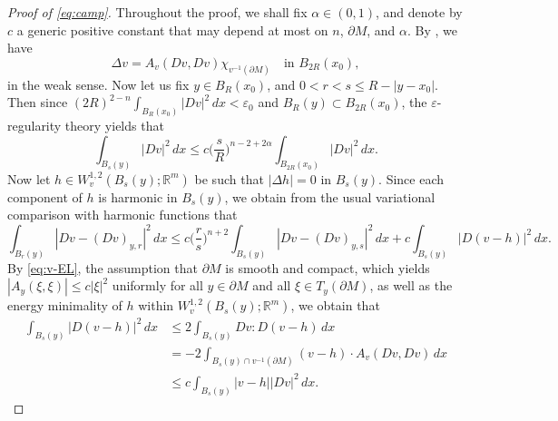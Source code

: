 \documentclass[11pt]{amsart}
\newcommand{\R}{{\mathbb R}}
\newcommand{\e}{\varepsilon}
\theoremstyle{plain}
\theoremstyle{definition}
\theoremstyle{remark}
\numberwithin{equation}{section}
\begin{document}
\begin{proof}[Proof of \eqref{eq:camp}]
    Throughout the proof, we shall fix $\alpha \in (0,1)$, and denote by $c$ a generic positive constant that may depend at most on $n$, $\partial M$, and $\alpha$.    
    By \cite{D}, we have 
    \begin{equation}
        \label{eq:v-EL}
        \Delta v = A_v(Dv,Dv)\chi_{v^{-1}(\partial M)}\quad\text{in }B_{2R}(x_0),
    \end{equation}
    in the weak sense. Now let us fix $y\in B_R(x_0)$, and $0< r< s \leq R - |y-x_0|$. Then since $(2R)^{2-n}\int_{B_R(x_0)} |Dv|^2\,dx < \e_0$ and $B_R(y)\subset B_{2R}(x_0)$, the $\e$-regularity theory \cite{L} yields that
    \begin{equation}
        \label{eq:e-reg-L}
        \int_{B_s(y)}|Dv|^2 \,dx \leq c \bigg(\frac{s}{R}\bigg)^{n-2+2\alpha} \int_{B_{2R}(x_0)} |Dv|^2\,dx. 
    \end{equation} 
    Now let $h\in W_v^{1,2}(B_s(y);\R^m)$ be such that $|\Delta h| = 0$ in $B_s(y)$. Since each component of $h$ is harmonic in $B_s(y)$, we obtain from the usual variational comparison with harmonic functions that 
    \begin{equation}
        \label{eq:v-h-C1a}
        \int_{B_r(y)} |Dv - (Dv)_{y,r}|^2\,dx \leq c\bigg(\frac{r}{s}\bigg)^{n+2}\int_{B_s(y)} |Dv - (Dv)_{y,s}|^2\,dx + c \int_{B_s(y)} |D(v-h)|^2\,dx. 
    \end{equation}
    By \eqref{eq:v-EL}, the assumption that $\partial M$ is smooth and compact, which yields $|A_y(\xi,\xi)|\leq c|\xi|^2$ uniformly for all $y\in \partial M$ and all $\xi\in T_y(\partial M)$, as well as the energy minimality of $h$ within $W_v^{1,2}(B_s(y);\R^m)$, we obtain that 
    \begin{equation}
        \label{eq:v-h-C1a-2}
        \begin{aligned}
            \int_{B_s(y)} |D(v-h)|^2\,dx &\leq 2\int_{B_s(y)} Dv:D(v-h)\,dx \\
            & = - 2\int_{B_s(y)\cap v^{-1}(\partial M)} (v-h)\cdot A_v(Dv,Dv)\,dx \\
            &\leq c \int_{B_s(y)} |v-h||Dv|^2\,dx. 
        \end{aligned}
    \end{equation}


\end{proof}
\end{document}
